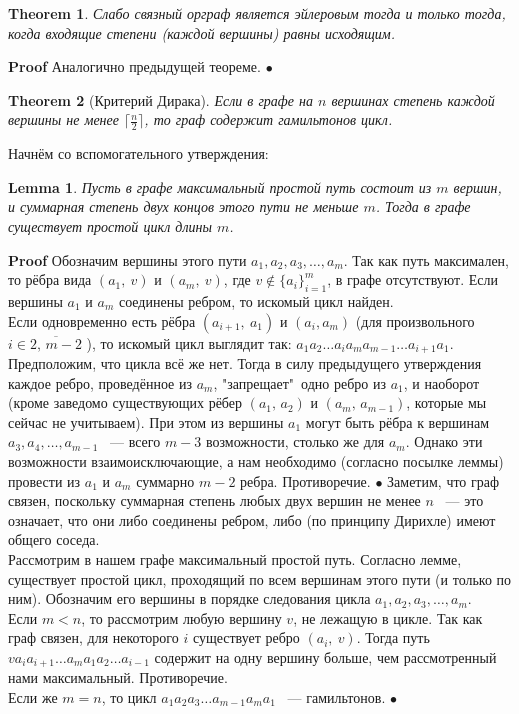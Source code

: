 \documentclass[a4paper]{article}
\theoremstyle{plain}
\newtheorem{theorem}{Theorem}
\newtheorem*{lem-star}{Lemma}
\theoremstyle{remark}
\theoremstyle{definition}
\renewenvironment{proof}{{\bfseries Proof}}{$\bullet$}
\begin{document}
\begin{theorem} Слабо связный орграф является эйлеровым тогда и только тогда, когда входящие степени (каждой вершины) равны исходящим.
\end{theorem}
\begin{proof} Аналогично предыдущей теореме.
\end{proof}
\begin{theorem}[Критерий Дирака] Если в графе на $n$ вершинах степень каждой вершины не менее $\lceil \frac{n}{2} \rceil$, то граф содержит гамильтонов цикл.
\end{theorem}
\begin{proof} Начнём со вспомогательного утверждения:
\begin{lem-star} Пусть в графе максимальный простой путь состоит из $m$ вершин, и суммарная степень двух концов этого пути не меньше $m$. Тогда в графе существует простой цикл длины $m$.
\end{lem-star}
\begin{proof} Обозначим вершины этого пути $a_1,a_2,a_3,\dots,a_m$. Так как путь максимален, то рёбра вида $(a_1,\:v)$ и $(a_m,\:v)$, где $v \notin \{a_i\}_{i=1}^m$, в графе отсутствуют. 
Если вершины $a_1$ и $a_m$ соединены ребром, то искомый цикл найден.\\
Если одновременно есть рёбра $(a_{i+1},\:a_1)$ и $(a_i,a_m)$ (для произвольного $ i \in \overline{2,\, m-2} $ ), то искомый цикл выглядит так: $a_1a_2\dots a_ia_ma_{m-1}\dots a_{i+1} a_1$.
Предположим, что цикла всё же нет. Тогда в силу предыдущего утверждения каждое ребро, проведённое из $a_m$, "запрещает"\ одно ребро из $a_1$, и наоборот (кроме заведомо существующих рёбер $(a_1,\,a_2)$ и $(a_m,\,a_{m-1})$, которые мы сейчас не учитываем). При этом из вершины $a_1$ могут быть рёбра к вершинам $a_3,a_4,\dots,a_{m-1}$ ~--- всего $m-3$ возможности, столько же для $a_m$. Однако эти возможности взаимоисключающие, а нам необходимо (согласно посылке леммы) провести из $a_1$ и $a_m$ суммарно $m-2$ ребра. Противоречие.
\end{proof}
Заметим, что граф связен, поскольку суммарная степень любых двух вершин не менее $n$ ~--- это означает, что они либо соединены ребром, либо (по принципу Дирихле) имеют общего соседа.\\
Рассмотрим в нашем графе максимальный простой путь. Согласно лемме, существует простой цикл, проходящий по всем вершинам этого пути (и только по ним). Обозначим его вершины в порядке следования цикла $a_1,a_2,a_3,\dots ,a_m$.\\
Если $m<n$, то рассмотрим любую вершину $v$, не лежащую в цикле. Так как граф связен, для некоторого $i$ существует ребро $(a_i,\:v)$. Тогда путь $va_ia_{i+1}\dots a_ma_1a_2\dots a_{i-1}$ содержит на одну вершину больше, чем рассмотренный нами максимальный. Противоречие.\\
Если же $m=n$, то цикл $a_1a_2a_3\dots a_{m-1}a_ma_1$ ~--- гамильтонов.
\end{proof}
\end{document}

